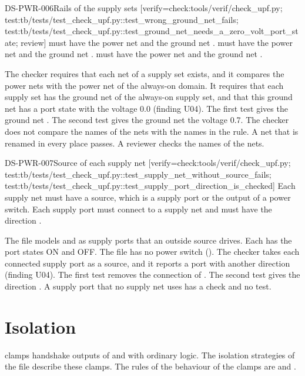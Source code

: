 \begin{requirement}{DS-PWR-006}{Rails of the supply sets}
[verify={check:tools/verif/check_upf.py; test:tb/tests/test_check_upf.py::test_wrong_ground_net_fails; test:tb/tests/test_check_upf.py::test_ground_net_needs_a_zero_volt_port_state; review}]
 must have the power net  and the ground net .  must have the power net  and the ground net .  must have the power net  and the ground net .
\end{requirement}
\begin{information}
The checker requires that each net of a supply set exists, and it compares the power nets with the power net of the always-on domain. It requires that each supply set has the ground net of the always-on supply set, and that this ground net has a port state with the voltage 0.0 (finding U04). The first test gives  the ground net . The second test gives the ground net the voltage 0.7. The checker does not compare the names of the nets with the names in the rule. A net that is renamed in every place passes. A reviewer checks the names of the nets.
\end{information}

\begin{requirement}{DS-PWR-007}{Source of each supply net}
[verify={check:tools/verif/check_upf.py; test:tb/tests/test_check_upf.py::test_supply_net_without_source_fails; test:tb/tests/test_check_upf.py::test_supply_port_direction_is_checked}]
Each supply net must have a source, which is a supply port or the output of a power switch. Each supply port must connect to a supply net and must have the direction .
\end{requirement}
\begin{information}
The file models  and  as supply ports that an outside source drives. Each has the port states ON and OFF. The file has no power switch (). The checker takes each connected supply port as a source, and it reports a port with another direction (finding U04). The first test removes the connection of . The second test gives  the direction . A supply port that no supply net uses has a check and no test.
\end{information}

\section{Isolation}\label{ds:ch:power-intent:isolation}
 clamps handshake outputs of  and  with ordinary logic. The isolation strategies of the file describe these clamps. The rules of the behaviour of the clamps are  and .


